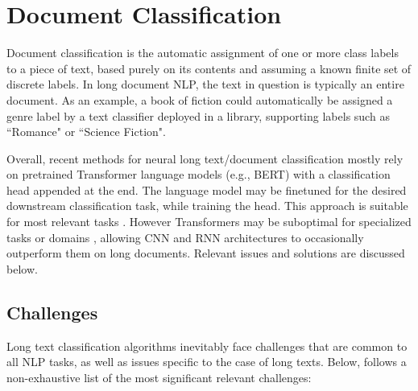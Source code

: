 \documentclass[preprint,review,10pt]{elsarticle}
\begin{document}
	
	\section{Document Classification}
	\label{sec::Classification}
	Document classification is the automatic assignment of one or more class labels to a piece of text, based purely on its contents and assuming a known finite set of discrete labels. In long document NLP, the text in question is typically an entire document. As an example, a book of fiction could automatically be assigned a genre label by a text classifier deployed in a library, supporting labels such as ``Romance" or ``Science Fiction".
	
	Overall, recent methods for neural long text/document classification mostly rely on pretrained Transformer language models (e.g., BERT) with a classification head appended at the end. The language model may be finetuned for the desired downstream classification task, while training the head. This approach is suitable for most relevant tasks \cite{qian} \cite{ion} \cite{ion2} \cite{mcbert} \cite{ammar} \cite{so}. However Transformers may be suboptimal for specialized tasks or domains \cite{junhua}, allowing CNN and RNN architectures to occasionally outperform them on long documents. Relevant issues and solutions are discussed below.
	
	\subsection{Challenges}
	\label{ssec::ClassificationChallenges}
	Long text classification algorithms inevitably face challenges that are common to all NLP tasks, as well as issues specific to the case of long texts. Below, follows a non-exhaustive list of the most significant relevant challenges:
	
\end{document}
